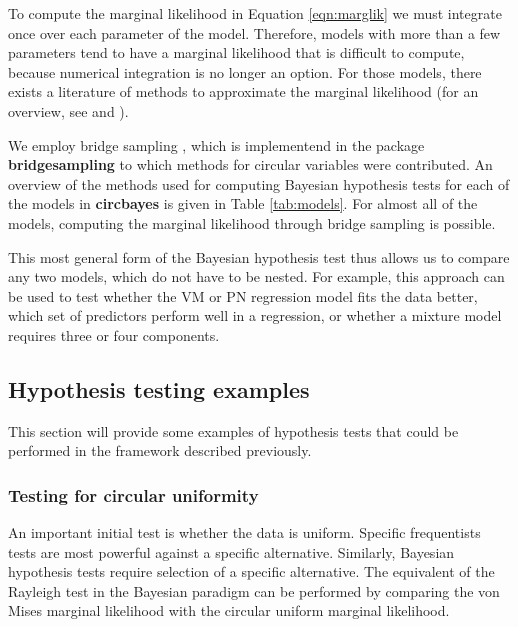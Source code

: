 \documentclass{article}
\newcommand{\pkg}[1]{\textbf{#1}}
\begin{document}
\label{sec:bridge}

To compute the marginal likelihood in Equation \ref{eqn:marglik} we must
integrate once over each parameter of the model. Therefore, models with
more than a few parameters tend to have a marginal likelihood that is
difficult to compute, because numerical integration is no longer an
option. For those models, there exists a literature of methods to
approximate the marginal likelihood (for an overview, see
\citet{friel2012estimating} and \citet{ardia2012comparative}).

We employ bridge sampling
\citep{meng1996simulating, gronau2017tutorial}, which is implementend in
the package \pkg{bridgesampling} \citep{gronau2017bridgesampling} to
which methods for circular variables were contributed. An overview of
the methods used for computing Bayesian hypothesis tests for each of the
models in \pkg{circbayes} is given in Table \ref{tab:models}. For almost
all of the models, computing the marginal likelihood through bridge
sampling is possible.

This most general form of the Bayesian hypothesis test thus allows us to
compare any two models, which do not have to be nested. For example,
this approach can be used to test whether the VM or PN regression model
fits the data better, which set of predictors perform well in a
regression, or whether a mixture model requires three or four
components.

\hypertarget{hypothesis-testing-examples}{%
	\subsection{Hypothesis testing
		examples}\label{hypothesis-testing-examples}}

This section will provide some examples of hypothesis tests that could
be performed in the framework described previously.

\hypertarget{testing-for-circular-uniformity}{%
	\subsubsection{Testing for circular
		uniformity}\label{testing-for-circular-uniformity}}

An important initial test is whether the data is uniform. Specific
frequentists tests are most powerful against a specific alternative.
Similarly, Bayesian hypothesis tests require selection of a specific
alternative. The equivalent of the Rayleigh test
\citep{mardia2009directional, brazier1994confidence} in the Bayesian
paradigm can be performed by comparing the von Mises marginal likelihood
with the circular uniform marginal likelihood.
\end{document}
